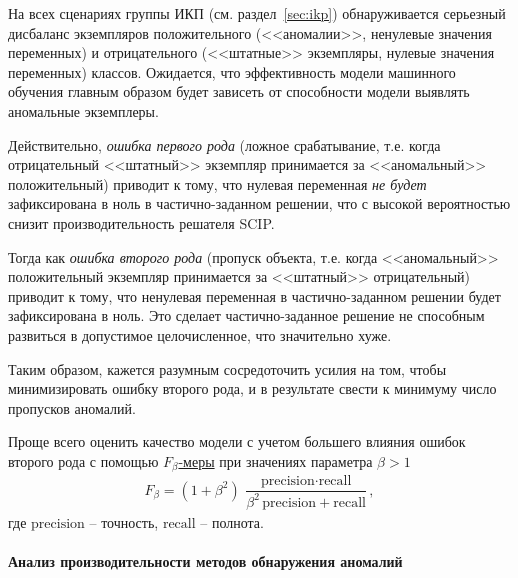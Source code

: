 \documentclass[%
	11pt,
	a4paper,
	utf8,
		]{article}
\begin{document}
На всех сценариях группы ИКП (см. раздел~\ref{sec:ikp}) обнаруживается серьезный дисбаланс экземпляров положительного (<<аномалии>>, ненулевые значения переменных) и отрицательного (<<штатные>> экземпляры, нулевые значения переменных) классов. Ожидается, что эффективность модели машинного обучения главным образом будет зависеть от способности модели выявлять аномальные экземплеры.

Действительно, \emph{ошибка первого рода} (ложное срабатывание, т.е. когда отрицательный <<штатный>> экземпляр принимается за <<аномальный>> положительный) приводит к тому, что нулевая переменная \emph{не будет} зафиксирована в ноль в частично-заданном решении, что с высокой вероятностью снизит производительность решателя SCIP.

Тогда как \emph{ошибка второго рода} (пропуск объекта, т.е. когда <<аномальный>> положительный экземпляр принимается за <<штатный>> отрицательный) приводит к тому, что ненулевая переменная в частично-заданном решении будет зафиксирована в ноль. Это сделает частично-заданное решение не способным развиться в допустимое целочисленное, что значительно хуже.

Таким образом, кажется разумным сосредоточить усилия на том, чтобы минимизировать {ошибку второго рода}, и в результате свести к минимуму число пропусков аномалий.

Проще всего оценить качество модели с учетом б\emph{о}льшего влияния ошибок второго рода с помощью \href{https://scikit-learn.org/stable/modules/model_evaluation.html#precision-recall-f-measure-metrics}{$ F_{\beta} $-меры} при значениях параметра $ \beta > 1 $
\begin{align*}
	F_{\beta} = (1 + \beta^2) \, \dfrac{\text{precision} \cdot \text{recall}}{\beta^2\, \text{precision} + \text{recall}},
\end{align*}
где $ \text{precision} $ -- точность, $ \text{recall} $ -- полнота.


\paragraph{Анализ производительности методов обнаружения аномалий} 
\end{document}
